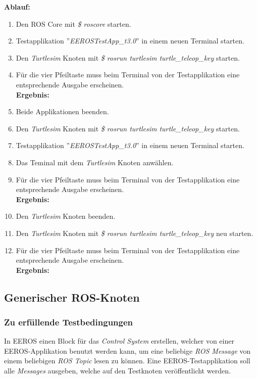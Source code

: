 \textbf{Ablauf: } 
\begin{enumerate}
\item Den ROS Core mit \textit{\$ roscore} starten.
\item Testapplikation ''\textit{EEROSTestApp\_t3.0}'' in einem neuen Terminal starten.
\item Den \textit{Turtlesim} Knoten mit \textit{\$ rosrun turtlesim turtle\_teleop\_key} starten.
\item Für die vier Pfeiltaste muss beim Terminal von der Testapplikation eine entsprechende Ausgabe erscheinen. \\
\textbf{Ergebnis:} \cmark
\item Beide Applikationen beenden.
\item Den \textit{Turtlesim} Knoten mit \textit{\$ rosrun turtlesim turtle\_teleop\_key} starten.
\item Testapplikation ''\textit{EEROSTestApp\_t3.0}'' in einem neuen Terminal starten.
\item Das Teminal mit dem \textit{Turtlesim} Knoten anwählen.
\item Für die vier Pfeiltaste muss beim Terminal von der Testapplikation eine entsprechende Ausgabe erscheinen. \\
\textbf{Ergebnis:} \cmark
\item Den \textit{Turtlesim} Knoten beenden.
\item Den \textit{Turtlesim} Knoten mit \textit{\$ rosrun turtlesim turtle\_teleop\_key} neu starten.
\item Für die vier Pfeiltaste muss beim Terminal von der Testapplikation eine entsprechende Ausgabe erscheinen. \\
\textbf{Ergebnis:} \cmark
\end{enumerate}


\subsection{Generischer ROS-Knoten}
\subsubsection{Zu erfüllende Testbedingungen}
In EEROS einen Block für das \textit{Control System} erstellen, welcher von einer EEROS-Applikation benutzt werden kann, um eine beliebige \textit{ROS Message} von einem beliebigen \textit{ROS Topic} lesen zu können.
Eine EEROS-Testapplikation soll alle \textit{Messages} ausgeben, welche auf den Testknoten veröffentlicht werden.

